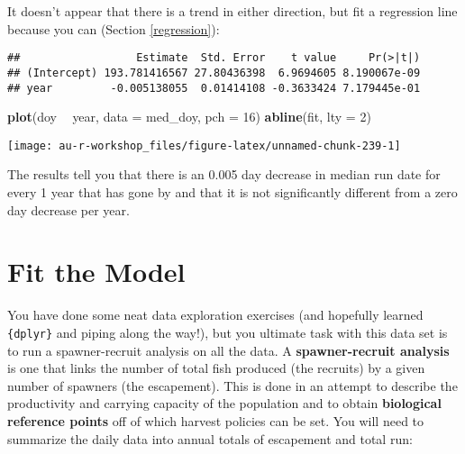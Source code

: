 \documentclass[]{book}
\newenvironment{Shaded}{\begin{snugshade}}{\end{snugshade}}
\newcommand{\KeywordTok}[1]{\textcolor[rgb]{0.13,0.29,0.53}{\textbf{#1}}}
\newcommand{\DataTypeTok}[1]{\textcolor[rgb]{0.13,0.29,0.53}{#1}}
\newcommand{\DecValTok}[1]{\textcolor[rgb]{0.00,0.00,0.81}{#1}}
\newcommand{\StringTok}[1]{\textcolor[rgb]{0.31,0.60,0.02}{#1}}
\newcommand{\OperatorTok}[1]{\textcolor[rgb]{0.81,0.36,0.00}{\textbf{#1}}}
\newcommand{\NormalTok}[1]{#1}
\theoremstyle{definition}
\theoremstyle{definition}
\theoremstyle{definition}
\theoremstyle{remark}
\begin{document}
It doesn't appear that there is a trend in either direction, but fit a
regression line because you can (Section \ref{regression}):

\begin{Shaded}
\end{Shaded}

\begin{verbatim}
##                  Estimate  Std. Error    t value     Pr(>|t|)
## (Intercept) 193.781416567 27.80436398  6.9694605 8.190067e-09
## year         -0.005138055  0.01414108 -0.3633424 7.179445e-01
\end{verbatim}

\begin{Shaded}
\begin{Highlighting}[]
\KeywordTok{plot}\NormalTok{(doy }\OperatorTok{~}\StringTok{ }\NormalTok{year, }\DataTypeTok{data =}\NormalTok{ med_doy, }\DataTypeTok{pch =} \DecValTok{16}\NormalTok{)}
\KeywordTok{abline}\NormalTok{(fit, }\DataTypeTok{lty =} \DecValTok{2}\NormalTok{)}
\end{Highlighting}
\end{Shaded}

\begin{center}\texttt{[image: au-r-workshop\_files/figure-latex/unnamed-chunk-239-1]} \end{center}

The results tell you that there is an 0.005 day decrease in median run
date for every 1 year that has gone by and that it is not significantly
different from a zero day decrease per year.

\section{Fit the Model}\label{fit-the-model}

You have done some neat data exploration exercises (and hopefully
learned \texttt{\{dplyr\}} and piping along the way!), but you ultimate
task with this data set is to run a spawner-recruit analysis on all the
data. A \textbf{spawner-recruit analysis} is one that links the number
of total fish produced (the recruits) by a given number of spawners (the
escapement). This is done in an attempt to describe the productivity and
carrying capacity of the population and to obtain \textbf{biological
reference points} off of which harvest policies can be set. You will
need to summarize the daily data into annual totals of escapement and
total run:
\end{document}
